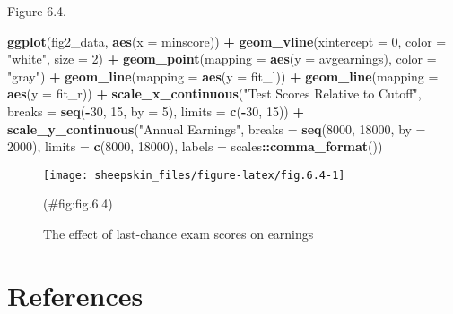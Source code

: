 \documentclass[]{book}
\newenvironment{Shaded}{\begin{snugshade}}{\end{snugshade}}
\newcommand{\DataTypeTok}[1]{\textcolor[rgb]{0.13,0.29,0.53}{#1}}
\newcommand{\DecValTok}[1]{\textcolor[rgb]{0.00,0.00,0.81}{#1}}
\newcommand{\KeywordTok}[1]{\textcolor[rgb]{0.13,0.29,0.53}{\textbf{#1}}}
\newcommand{\NormalTok}[1]{#1}
\newcommand{\OperatorTok}[1]{\textcolor[rgb]{0.81,0.36,0.00}{\textbf{#1}}}
\newcommand{\StringTok}[1]{\textcolor[rgb]{0.31,0.60,0.02}{#1}}
\theoremstyle{definition}
\theoremstyle{definition}
\theoremstyle{definition}
\theoremstyle{remark}
\begin{document}
Figure 6.4.

\begin{Shaded}
\begin{Highlighting}[]
\KeywordTok{ggplot}\NormalTok{(fig2_data, }\KeywordTok{aes}\NormalTok{(}\DataTypeTok{x =}\NormalTok{ minscore)) }\OperatorTok{+}
\StringTok{  }\KeywordTok{geom_vline}\NormalTok{(}\DataTypeTok{xintercept =} \DecValTok{0}\NormalTok{, }\DataTypeTok{color =} \StringTok{"white"}\NormalTok{, }\DataTypeTok{size =} \DecValTok{2}\NormalTok{) }\OperatorTok{+}
\StringTok{  }\KeywordTok{geom_point}\NormalTok{(}\DataTypeTok{mapping =} \KeywordTok{aes}\NormalTok{(}\DataTypeTok{y =}\NormalTok{ avgearnings), }\DataTypeTok{color =} \StringTok{"gray"}\NormalTok{) }\OperatorTok{+}
\StringTok{  }\KeywordTok{geom_line}\NormalTok{(}\DataTypeTok{mapping =} \KeywordTok{aes}\NormalTok{(}\DataTypeTok{y =}\NormalTok{ fit_l)) }\OperatorTok{+}
\StringTok{  }\KeywordTok{geom_line}\NormalTok{(}\DataTypeTok{mapping =} \KeywordTok{aes}\NormalTok{(}\DataTypeTok{y =}\NormalTok{ fit_r)) }\OperatorTok{+}
\StringTok{  }\KeywordTok{scale_x_continuous}\NormalTok{(}\StringTok{"Test Scores Relative to Cutoff"}\NormalTok{,}
                     \DataTypeTok{breaks =} \KeywordTok{seq}\NormalTok{(}\OperatorTok{-}\DecValTok{30}\NormalTok{, }\DecValTok{15}\NormalTok{, }\DataTypeTok{by =} \DecValTok{5}\NormalTok{), }\DataTypeTok{limits =} \KeywordTok{c}\NormalTok{(}\OperatorTok{-}\DecValTok{30}\NormalTok{, }\DecValTok{15}\NormalTok{)) }\OperatorTok{+}
\StringTok{  }\KeywordTok{scale_y_continuous}\NormalTok{(}\StringTok{"Annual Earnings"}\NormalTok{, }\DataTypeTok{breaks =} \KeywordTok{seq}\NormalTok{(}\DecValTok{8000}\NormalTok{, }\DecValTok{18000}\NormalTok{, }\DataTypeTok{by =} \DecValTok{2000}\NormalTok{),}
                     \DataTypeTok{limits =} \KeywordTok{c}\NormalTok{(}\DecValTok{8000}\NormalTok{, }\DecValTok{18000}\NormalTok{), }\DataTypeTok{labels =}\NormalTok{ scales}\OperatorTok{::}\KeywordTok{comma_format}\NormalTok{())}
\end{Highlighting}
\end{Shaded}

\begin{figure}

{\centering \texttt{[image: sheepskin\_files/figure-latex/fig.6.4-1]} 

}

\caption{The effect of last-chance exam scores on earnings}(\#fig:fig.6.4)
\end{figure}

\hypertarget{references-9}{%
\section*{References}\label{references-9}}
\end{document}
